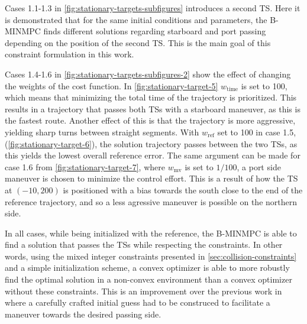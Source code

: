 
Cases 1.1-1.3 in \cref{fig:stationary-targets-subfigures} introduces a second TS. Here it is demonstrated that for the same initial conditions and parameters, the B-MINMPC finds different solutions regarding starboard and port passing depending on the position of the second TS. This is the main goal of this constraint formulation in this work. 

Cases 1.4-1.6 in \cref{fig:stationary-targets-subfigures-2} show the effect of changing the weights of the cost function. In \cref{fig:stationary-target-5} $w_\text{time}$ is set to 100, which means that minimizing the total time of the trajectory is prioritized. This results in a trajectory that passes both TSs with a starboard maneuver, as this is the fastest route. Another effect of this is that the trajectory is more aggressive, yielding sharp turns between straight segments. With $w_\text{ref}$ set to 100 in case 1.5, (\cref{fig:stationary-target-6}), the solution trajectory passes between the two TSs, as this yields the lowest overall reference error. The same argument can be made for case 1.6 from \cref{fig:stationary-target-7}, where $w_\text{mv}$ is set to $1/100$, a port side maneuver is chosen to minimize the control effort. This is a result of how the TS at $(-10, 200)$ is positioned with a bias towards the south close to the end of the reference trajectory, and so a less agressive maneuver is possible on the northern side. 

In all cases, while being initialized with the reference, the B-MINMPC is able to find a solution that passes the TSs while respecting the constraints. In other words, using the mixed integer constraints presented in \cref{sec:collision-constraints} and a simple initialization scheme, a convex optimizer is able to more robustly find the optimal solution in a non-convex environment than a convex optimizer without these constraints. This is an improvement over the previous work in \cite{Thyri2022-MPC,prosjektoppgave} where a carefully crafted initial guess had to be construced to facilitate a maneuver towards the desired passing side.

